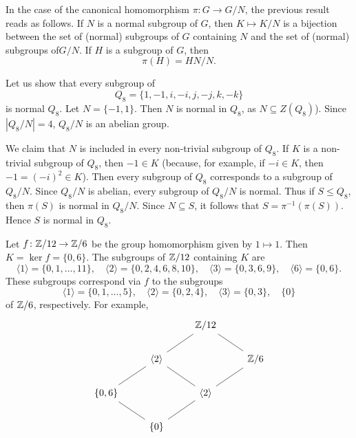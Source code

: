 In the case of the canonical homomorphism $\pi\colon
 G\to G/N$, the previous result reads as follows. 
If $N$ is a normal subgroup of $G$, then
$K\mapsto K/N$ is a bijection between the set of 
(normal) subgroups of $G$ containing $N$ and the 
set of (normal) subgroups of$G/N$.
If $H$ is a subgroup of $G$, then
\[
\pi(H)=HN/N.
\]
\begin{example}
Let us show that every subgroup of 
\[
Q_8=\{1,-1,i,-i,j,-j,k,-k\}
\]
is normal $Q_8$. Let $N=\{-1,1\}$. Then $N$ is normal in $Q_8$, as $N\subseteq Z(Q_8)$). Since $|Q_8/N|=4$, 
$Q_8/N$ is an abelian group. 

We claim that $N$ is included in every non-trivial 
subgroup of $Q_8$. If 
$K$ is a non-trivial subgroup of $Q_8$, then $-1\in K$ (because, for example, if $-i\in K$, then
 $-1=(-i)^2\in K$).
Then every subgroup of $Q_8$ corresponds to a subgroup of $Q_8/N$. 
Since $Q_8/N$ is abelian, every subgroup of $Q_8/N$ is normal. Thus 
if $S\leq Q_8$, then 
$\pi(S)$ is normal in $Q_8/N$.
Since $N\subseteq S$, it follows that
$S=\pi^{-1}(\pi(S))$. Hence $S$ is normal in $Q_8$.
\end{example}


\begin{example}
Let $f\colon\mathbb{Z}/12\to\mathbb{Z}/6$ be the group homomorphism given by 
$1\mapsto 1$. Then $K=\ker f=\{0,6\}$.
The subgroups of $\mathbb{Z}/12$ containing $K$ are
\[
\langle 1\rangle=\{0,1,\dots,11\},
\quad
\langle 2\rangle=\{0,2,4,6,8,10\},
\quad
\langle 3\rangle=\{0,3,6,9\},
\quad
\langle 6\rangle=\{0,6\}.
\]
These subgroups correspond via $f$ to
the subgroups
\[
\langle 1\rangle=\{0,1,\dots,5\},
\quad
\langle 2\rangle=\{0,2,4\},
\quad
\langle 3\rangle=\{0,3\},
\quad
\{0\}
\]
of $\mathbb{Z}/6$, respectively. 
For example, 
\[
\begin{tikzcd}
        && \Z/12 \\
        & \langle 2\rangle && {\Z/6} \\
        \{0,6\} && \langle 2\rangle \\
        & {\{0\}}
        \arrow[no head, from=1-3, to=2-4]
        \arrow[no head, from=1-3, to=2-2]
        \arrow[no head, from=2-2, to=3-1]
        \arrow[no head, from=3-1, to=4-2]
        \arrow[no head, from=2-2, to=3-3]
        \arrow[no head, from=3-3, to=4-2]
        \arrow[no head, from=2-4, to=3-3]
\end{tikzcd}
\]
\end{example}

